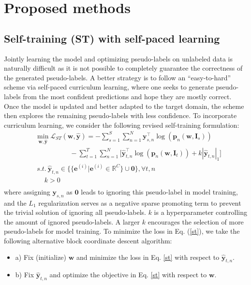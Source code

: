 \documentclass[runningheads]{llncs}
\begin{document}
\section{Proposed methods}\label{sect_st}
\subsection{Self-training (ST) with self-paced learning}
Jointly learning the model and optimizing pseudo-labels on unlabeled data is naturally difficult as it is not possible to completely guarantee the correctness of the generated pseudo-labels. A better strategy is to follow an ``easy-to-hard'' scheme via self-paced curriculum learning, where one seeks to generate pseudo-labels from the most confident predictions and hope they are mostly correct. Once the model is updated and better adapted to the target domain, the scheme then explores the remaining pseudo-labels with less confidence. To incorporate curriculum learning, we consider the following revised self-training formulation:
\begin{equation}\label{st}
\begin{aligned}
& \min_{\mathbf{w},\hat{\mathbf{y}}}\mathcal{L}_{ST}(\mathbf{w},\hat{\mathbf{y}}) = -\sum_{s=1}^{S}\sum_{n=1}^{N}\mathbf{y}_{s,n}^\top\log (\mathbf{p}_n(\mathbf{w},\mathbf{I}_s)) \\
&~~~~~~~~~~~~~~~~~~~~~~~ - \sum_{t=1}^{T}\sum_{n=1}^{N}\big[\hat{\mathbf{y}}_{t,n}^\top\log (\mathbf{p}_n(\mathbf{w},\mathbf{I}_t))+k|\hat{\mathbf{y}}_{t,n}|_1\big]\\
& ~s.t. ~ \hat{\mathbf{y}}_{t,n} \in \{\{\mathbf{e}^{(i)}|\mathbf{e}^{(i)} \in \mathbb{R}^C\} \cup \mathbf{0}\}, \forall t,n\\
&~~~~~~k > 0\\
\end{aligned}
\end{equation}
where assigning $\mathbf{y}_{s,n}$ as $\mathbf{0}$ leads to ignoring this pseudo-label in model training, and the $L_1$ regularization serves as a negative sparse promoting term to prevent the trivial solution of ignoring all pseudo-labels. $k$ is a hyperparameter controlling the amount of ignored pseudo-labels. A larger $k$ encourages the selection of more pseudo-labels for model training. To minimize the loss in Eq. (\ref{st}), we take the following alternative block coordinate descent algorithm:
\begin{itemize}
\item a) Fix (initialize) $\mathbf{w}$ and minimize the loss in Eq. \ref{st} with respect to $\hat{\mathbf{y}}_{t,n}$.
\item b) Fix $\hat{\mathbf{y}}_{t,n}$ and optimize the objective in Eq. \ref{st} with respect to $\mathbf{w}$.
\end{itemize}
\end{document}
